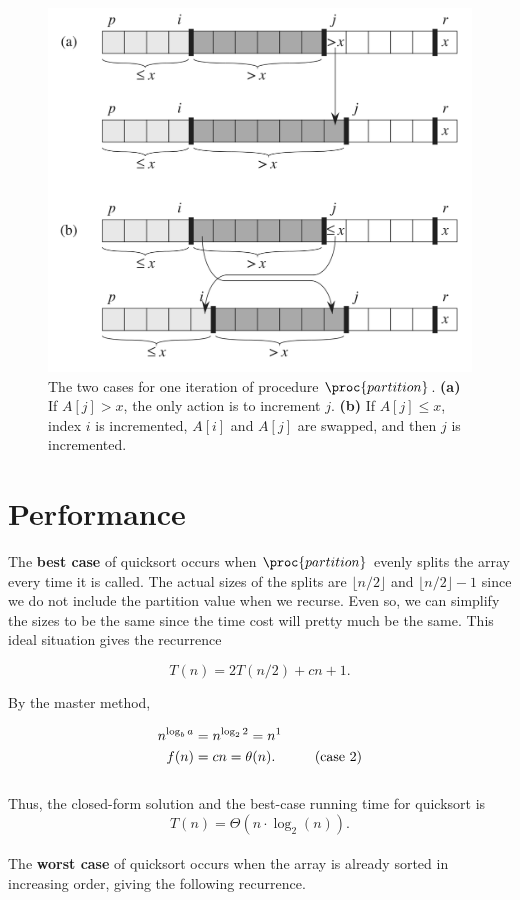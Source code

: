 \documentclass[12pt]{article}
\begin{document}
\begin{figure}[!ht]
\includegraphics[scale=0.45]{partition_cases}
\caption{
    The two cases for one iteration of procedure $\proc{partition}$. 
    \textbf{(a)} If $A[j] > x$, the only action is to increment $j$.
    \textbf{(b)} If $A[j] \leq x$, index $i$ is incremented, $A[i]$ and $A[j]$ are swapped, and then $j$ is incremented.
}
\label{fig:quicksort3}
\end{figure}

\newpage

\section*{Performance}
The \textbf{best case} of quicksort occurs when $\proc{partition}$ evenly splits the array every time it is called. The actual sizes of the splits are $\lfloor n/2 \rfloor$ and $\lfloor n/2 \rfloor - 1$ since we do not include the partition value when we recurse. Even so, we can simplify the sizes to be the same since the time cost will pretty much be the same. This ideal situation gives the recurrence

\begin{equation*}
    T(n) = 2T(n/2) + cn + 1.
\end{equation*}

By the master method,

\begin{equation*}
\begin{split}
    n^{\log_b{a}} & = n^{\log_2{2}} = n^1 \\
    f(n) & = cn = \theta{(n)}. \text{\hspace{10mm}(case 2)}
\end{split}
\end{equation*}
\\
Thus, the closed-form solution and the best-case running time for quicksort is
\begin{equation*}
    T(n) = \Theta{(n \cdot \log_2{(n)})}.
\end{equation*}
\\
The \textbf{worst case} of quicksort occurs when the array is already sorted in increasing order, giving the following recurrence.
\end{document}
